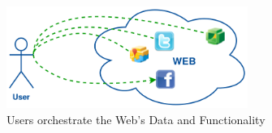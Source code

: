 \begin{figure}[!ht]
  \centering
  \includegraphics[width=0.7\textwidth]{figures/UsersWeildServicesInTheWeb}
  \caption{Users orchestrate the Web's Data and Functionality}
  \label{fig:UsersWeildServicesInTheWeb}
\end{figure}


